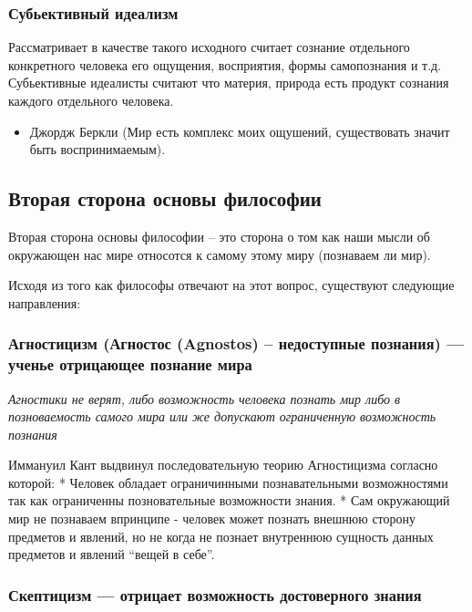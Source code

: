 \documentclass[a4paper, 14pt]{extreport}
\begin{document}
\subsubsection{Субьективный идеализм}

Рассматривает в качестве такого исходного считает сознание отдельного
конкретного человека его ощущения, восприятия, формы самопознания и т.д.
Субьективные идеалисты считают что материя, природа есть продукт
сознания каждого отдельного человека.

\begin{itemize}

\item
  Джордж Беркли (Мир есть комплекс моих ощушений, существовать значит
  быть воспринимаемым).
\end{itemize}

\subsection{Вторая сторона основы философии}

Вторая сторона основы философии -- это сторона о том как наши мысли об
окружающен нас мире относотся к самому этому миру (познаваем ли мир).

Исходя из того как философы отвечают на этот вопрос, существуют
следующие направления:

\subsubsection{Агностицизм (Агностос (Agnostos) -- недоступные познания)
--- ученье отрицающее познание мира}

\emph{Агностики не верят, либо возможность человека познать мир либо в
позноваемость самого мира или же допускают ограниченную возможность
познания}

Иммануил Кант выдвинул последовательную теорию Агностицизма согласно
которой: * Человек обладает ограничинными познавательными возможностями
так как ограниченны позновательные возможности знания. * Сам окружающий
мир не познаваем впринципе - человек может познать внешнюю сторону
предметов и явлений, но не когда не познает внутреннюю сущность данных
предметов и явлений ``вещей в себе''.

\subsubsection{Скептицизм --- отрицает возможность достоверного знания}
\end{document}
